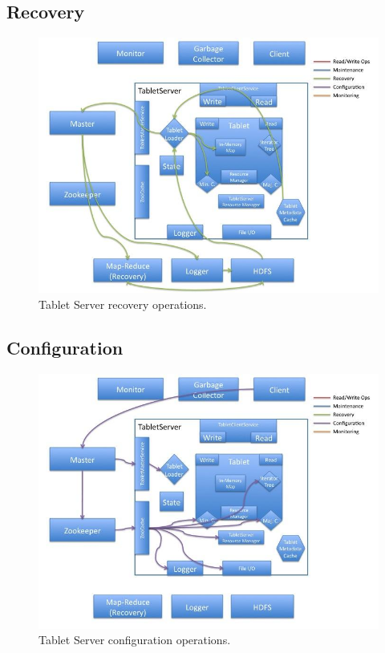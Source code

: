 \documentclass[letterpaper,onecolumn,12pt,titlepage]{article}
\begin{document}

\subsection{Recovery}
\begin{figure}[htbp]
\center
\includegraphics[scale=.6]{images/tserver_recovery.jpg}
\caption{\label{fig_ts_recovery} Tablet Server recovery operations.}
\end{figure}

\subsection{Configuration}
\begin{figure}[htbp]
\center
\includegraphics[scale=.6]{images/tserver_config.jpg}
\caption{\label{fig_ts_config} Tablet Server configuration operations.}
\end{figure}
\end{document}
